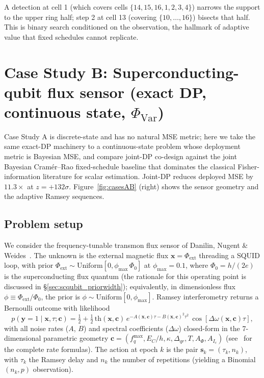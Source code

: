 \documentclass[11pt,a4paper,onecolumn]{article}
\newcommand{\bx}{\bm{x}}
\newcommand{\bc}{\bm{c}}
\newcommand{\bs}{\bm{s}}
\newcommand{\by}{\bm{y}}
\begin{document}
A detection at cell 1 (which covers cells $\{14, 15, 16, 1, 2, 3, 4\}$) narrows the support to the upper ring half; step 2 at cell 13 (covering $\{10, \ldots, 16\}$) bisects that half.  This is binary search conditioned on the observation, the hallmark of adaptive value that fixed schedules cannot replicate.

\section{Case Study B: Superconducting-qubit flux sensor (exact DP, continuous state, $\Phi_{\text{Var}}$)}
\label{sec:scqubit}

Case Study A is discrete-state and has no natural MSE metric; here we take the same exact-DP machinery to a continuous-state problem whose deployment metric is Bayesian MSE, and compare joint-DP co-design against the joint Bayesian Cram\'er--Rao fixed-schedule baseline that dominates the classical Fisher-information literature for scalar estimation.  Joint-DP reduces deployed MSE by $11.3\times$ at $z = +132\sigma$.  Figure~\ref{fig:casesAB} (right) shows the sensor geometry and the adaptive Ramsey sequences.

\subsection{Problem setup}

We consider the frequency-tunable transmon flux sensor of Danilin, Nugent \& Weides~\cite{danilin2024scqubit}.  The unknown is the external magnetic flux $\bx = \Phi_\mathrm{ext}$ threading a SQUID loop, with prior $\Phi_\mathrm{ext} \sim \mathrm{Uniform}[0, \phi_{\max}\,\Phi_0]$ at $\phi_{\max} = 0.1$, where $\Phi_0 = h/(2e)$ is the superconducting flux quantum (the rationale for this operating point is discussed in §\ref{sec:scqubit_priorwidth}); equivalently, in dimensionless flux $\phi \equiv \Phi_\mathrm{ext}/\Phi_0$, the prior is $\phi \sim \mathrm{Uniform}[0, \phi_{\max}]$.  Ramsey interferometry returns a Bernoulli outcome with likelihood
\begin{equation}
p(\by = 1 \mid \bx, \tau; \bc) = \tfrac{1}{2} + \tfrac{1}{2}\,\mathrm{th}(\bx, \bc)\,e^{-A(\bx, \bc)\tau - B(\bx, \bc)^2 \tau^2}\,\cos[\Delta\omega(\bx, \bc)\tau],
\label{eq:ramsey_likelihood}
\end{equation}
with all noise rates ($A$, $B$) and spectral coefficients ($\Delta\omega$) closed-form in the 7-dimensional parametric geometry $\bc = (f_q^{\max}, E_C/h, \kappa, \Delta_{qr}, T, A_\Phi, A_{I_c})$ (see~\cite{danilin2024scqubit} for the complete rate formulas).  The action at epoch $k$ is the pair $\bs_k = (\tau_k, n_k)$, with $\tau_k$ the Ramsey delay and $n_k$ the number of repetitions (yielding a Binomial$(n_k, p)$ observation).
\end{document}
